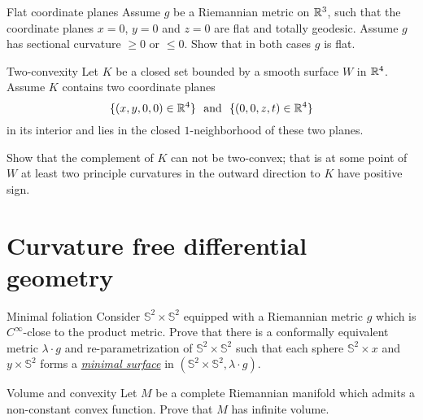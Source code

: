 \documentclass[twoside]{book}
\begin{document}
\begin{pr}{}{Flat coordinate planes}\label{Flat coordinate planes}
Assume $g$ be a Riemannian metric on $\mathbb{R}^3$,
such that the coordinate planes $x=0$, $y=0$ and $z=0$ are flat and totally geodesic.
Assume $g$ has sectional curvature $\ge 0$ or $\le 0$.
Show that in both cases $g$ is flat. 
\end{pr}

\begin{pr}{\many}{Two-convexity}\label{Two-convexity}
Let $K$ be a closed set bounded by a smooth surface $W$
in $\mathbb{R}^4$.
Assume $K$ contains two coordinate planes $$\{(x,y,0,0)\in\RR^4\}\ \ 
\text{and}
\ \ \{(0,0,z,t)\in\RR^4\}$$
in its interior 
and lies in the closed $1$-neighborhood of these two planes.

Show that the complement of $K$ can not be two-convex;
that is at some point of $W$ at least two principle curvatures in the outward direction to $K$
have positive sign.
\end{pr}





\chapter{Curvature free differential geometry}


\begin{pr}{\thm}{Minimal foliation}\label{gromomorphic-curves} 
Consider $\mathbb{S}^2\times \mathbb{S}^2$ equipped with a Riemannian metric $g$ 
which is $C^\infty$-close to the product metric. 
Prove that there is a conformally equivalent metric $\lambda\cdot g$ and re-parametrization of $\mathbb{S}^2\times \mathbb{S}^2$
such that each sphere $\mathbb{S}^2\times x$ and $y\times \mathbb{S}^2$ forms a 
\hyperref[Minimal surface]{\emph{minimal surface}} 
in $(\mathbb{S}^2\times \mathbb{S}^2,\lambda\cdot g)$.
\end{pr}


\begin{pr}{\thm}{Volume and convexity}
\label{Volume and convexity} 
Let
$M$ be a complete Riemannian manifold which admits a non-constant
convex function. Prove that $M$ has infinite volume.
\end{pr}
\end{document}
